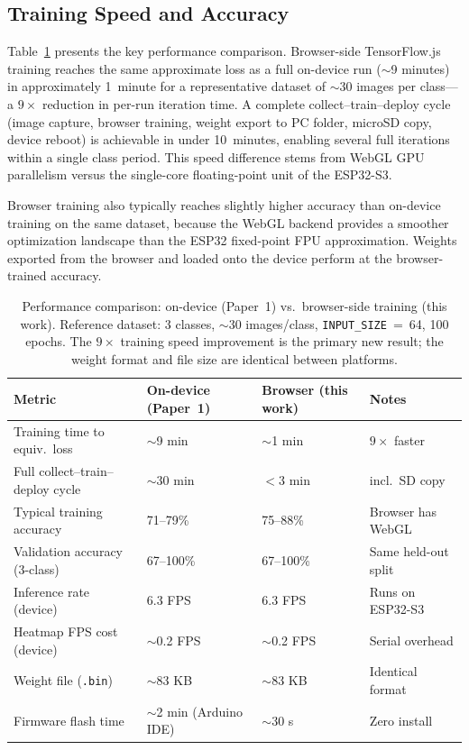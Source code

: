 \documentclass[11pt]{article}
\begin{document}
\subsection{Training Speed and Accuracy}

Table~\ref{tab:eval} presents the key performance comparison. Browser-side TensorFlow.js
training reaches the same approximate loss as a full on-device run ($\sim$9 minutes) in
approximately 1~minute for a representative dataset of $\sim$30 images per class---a
$9\times$ reduction in per-run iteration time. A complete collect--train--deploy cycle
(image capture, browser training, weight export to PC folder, microSD copy, device
reboot) is achievable in under 10~minutes, enabling several full iterations within a
single class period. This speed difference stems from WebGL GPU parallelism versus the
single-core floating-point unit of the ESP32-S3.

Browser training also typically reaches slightly higher accuracy than on-device training
on the same dataset, because the WebGL backend provides a smoother optimization
landscape than the ESP32 fixed-point FPU approximation. Weights exported from the
browser and loaded onto the device perform at the browser-trained accuracy.

\begin{table}[h]
\centering
\caption{Performance comparison: on-device (Paper~1) vs.\ browser-side training
         (this work). Reference dataset: 3 classes, $\sim$30 images/class,
         \texttt{INPUT\_SIZE}~=~64, 100 epochs. The $9\times$ training speed improvement
         is the primary new result; the weight format and file size are identical
         between platforms.}
\label{tab:eval}
\begin{tabular}{@{}p{5cm}p{3.5cm}p{3.5cm}l@{}}
\toprule
\textbf{Metric} & \textbf{On-device (Paper~1)} & \textbf{Browser (this work)} & \textbf{Notes} \\
\midrule
Training time to equiv.\ loss  & $\sim$9 min     & $\sim$1 min    & $9\times$ faster \\
Full collect--train--deploy cycle & $\sim$30 min & $<$3 min       & incl.\ SD copy \\
Typical training accuracy       & 71--79\%       & 75--88\%       & Browser has WebGL \\
Validation accuracy (3-class)   & 67--100\%      & 67--100\%      & Same held-out split \\
Inference rate (device)         & 6.3 FPS        & 6.3 FPS        & Runs on ESP32-S3 \\
Heatmap FPS cost (device)       & $\sim$0.2 FPS  & $\sim$0.2 FPS  & Serial overhead \\
Weight file (\texttt{.bin})     & $\sim$83 KB    & $\sim$83 KB    & Identical format \\
Firmware flash time             & $\sim$2 min (Arduino IDE) & $\sim$30 s  & Zero install \\
\bottomrule
\end{tabular}
\end{table}
\end{document}
